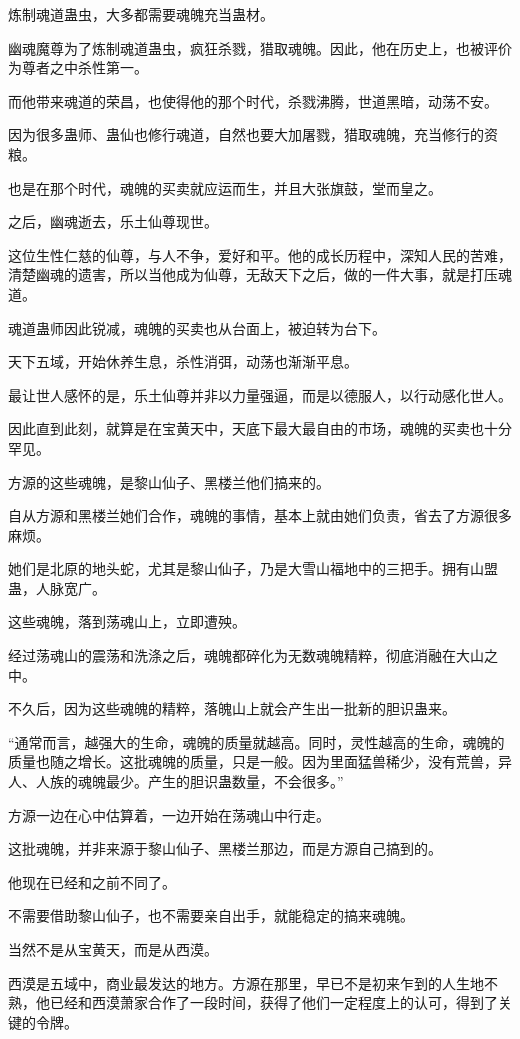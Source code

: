 \begin{this_body}
炼制魂道蛊虫，大多都需要魂魄充当蛊材。

幽魂魔尊为了炼制魂道蛊虫，疯狂杀戮，猎取魂魄。因此，他在历史上，也被评价为尊者之中杀性第一。

而他带来魂道的荣昌，也使得他的那个时代，杀戮沸腾，世道黑暗，动荡不安。

因为很多蛊师、蛊仙也修行魂道，自然也要大加屠戮，猎取魂魄，充当修行的资粮。

也是在那个时代，魂魄的买卖就应运而生，并且大张旗鼓，堂而皇之。

之后，幽魂逝去，乐土仙尊现世。

这位生性仁慈的仙尊，与人不争，爱好和平。他的成长历程中，深知人民的苦难，清楚幽魂的遗害，所以当他成为仙尊，无敌天下之后，做的一件大事，就是打压魂道。

魂道蛊师因此锐减，魂魄的买卖也从台面上，被迫转为台下。

天下五域，开始休养生息，杀性消弭，动荡也渐渐平息。

最让世人感怀的是，乐土仙尊并非以力量强逼，而是以德服人，以行动感化世人。

因此直到此刻，就算是在宝黄天中，天底下最大最自由的市场，魂魄的买卖也十分罕见。

方源的这些魂魄，是黎山仙子、黑楼兰他们搞来的。

自从方源和黑楼兰她们合作，魂魄的事情，基本上就由她们负责，省去了方源很多麻烦。

她们是北原的地头蛇，尤其是黎山仙子，乃是大雪山福地中的三把手。拥有山盟蛊，人脉宽广。

这些魂魄，落到荡魂山上，立即遭殃。

经过荡魂山的震荡和洗涤之后，魂魄都碎化为无数魂魄精粹，彻底消融在大山之中。

不久后，因为这些魂魄的精粹，落魄山上就会产生出一批新的胆识蛊来。

“通常而言，越强大的生命，魂魄的质量就越高。同时，灵性越高的生命，魂魄的质量也随之增长。这批魂魄的质量，只是一般。因为里面猛兽稀少，没有荒兽，异人、人族的魂魄最少。产生的胆识蛊数量，不会很多。”

方源一边在心中估算着，一边开始在荡魂山中行走。

这批魂魄，并非来源于黎山仙子、黑楼兰那边，而是方源自己搞到的。

他现在已经和之前不同了。

不需要借助黎山仙子，也不需要亲自出手，就能稳定的搞来魂魄。

当然不是从宝黄天，而是从西漠。

西漠是五域中，商业最发达的地方。方源在那里，早已不是初来乍到的人生地不熟，他已经和西漠萧家合作了一段时间，获得了他们一定程度上的认可，得到了关键的令牌。


\end{this_body}
